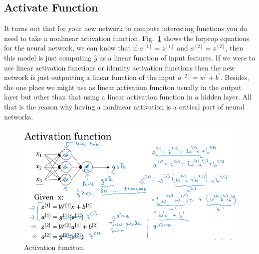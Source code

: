 \documentclass[a4paper]{article}
\begin{document}
\subsection{Activate Function}
It turns out that for your new network to compute interesting functions you do need to take a nonlinear activation function. Fig.~\ref{p14} shows the forprop equations for the neural network, we can know that if $a^{[1]}=z^{[1]}$ and $a^{[2]}=z^{[2]}$, then this model is just computing $\hat{y}$ as a linear function of input features. If we were to use linear activation functions or identity activation functions then the new network is just outputting a linear function of the input $a^{[2]}=w^\prime+b^\prime$. Besides, the one place we might use as linear activation funciton usually in the output layer but other than that using a linear activation function in a hidden layer. All that is the reason why having a nonlinear activation is a critical part of neural networks.
 \begin{figure}
	\begin{center}
		\includegraphics[scale=0.3]{figures/17.png}
	\end{center}
	\caption{Activation funciton.}
	\label{p14}
\end{figure}
\end{document}
